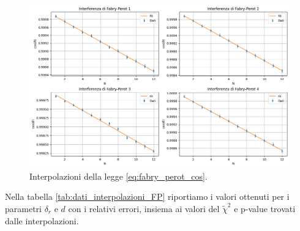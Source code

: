 \documentclass[letterpaper,12pt]{article}
\begin{document}

\begin{figure}[h!]
    \centering
    \includegraphics[width=1\textwidth]{verifica_fabry_perot.png}
    \caption{Interpolazioni della legge \ref{eq:fabry_perot_cos}.}
    \label{fig:verifica_fabry_perot}
\end{figure}

Nella tabella \ref{tab:dati_interpolazioni_FP} riportiamo i valori ottenuti per i parametri $\delta_r$ e $d$ 
con i relativi errori, insiema ai valori del $\tilde{\chi}^2$ e p-value trovati dalle interpolazioni.

\end{document}
